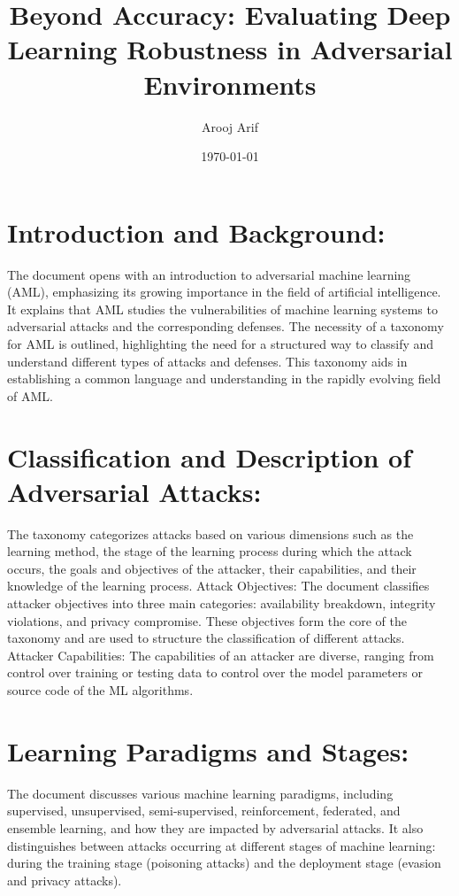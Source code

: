 \documentclass[10pt, conference, a4paper, final]{IEEEtran}
\title{Beyond Accuracy: Evaluating Deep Learning Robustness in Adversarial Environments}
\author{Arooj Arif}
\date{\today} %
\begin{document}
\maketitle %

\section{Introduction and Background:}


The document opens with an introduction to adversarial machine learning (AML), emphasizing its growing importance in the field of artificial intelligence. It explains that AML studies the vulnerabilities of machine learning systems to adversarial attacks and the corresponding defenses.
The necessity of a taxonomy for AML is outlined, highlighting the need for a structured way to classify and understand different types of attacks and defenses. This taxonomy aids in establishing a common language and understanding in the rapidly evolving field of AML.
\section{Classification and Description of Adversarial Attacks:}

The taxonomy categorizes attacks based on various dimensions such as the learning method, the stage of the learning process during which the attack occurs, the goals and objectives of the attacker, their capabilities, and their knowledge of the learning process.
Attack Objectives: The document classifies attacker objectives into three main categories: availability breakdown, integrity violations, and privacy compromise. These objectives form the core of the taxonomy and are used to structure the classification of different attacks.
Attacker Capabilities: The capabilities of an attacker are diverse, ranging from control over training or testing data to control over the model parameters or source code of the ML algorithms.
\section{Learning Paradigms and Stages:}

The document discusses various machine learning paradigms, including supervised, unsupervised, semi-supervised, reinforcement, federated, and ensemble learning, and how they are impacted by adversarial attacks.
It also distinguishes between attacks occurring at different stages of machine learning: during the training stage (poisoning attacks) and the deployment stage (evasion and privacy attacks).
\end{document}
